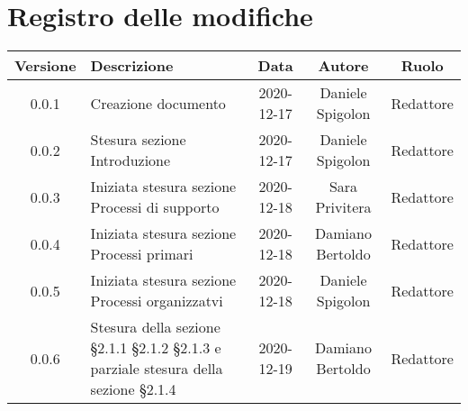 \section*{Registro delle modifiche}

\begin{center}
	\begin{longtable}{|c|p{5cm}|c|c|c|}
	\hline
	\rowcolor{lighter-grayer}
	\textbf{Versione} & \textbf{Descrizione} & \textbf{Data} & \textbf{Autore} & \textbf{Ruolo} \\
	\hline
	\endfirsthead


	0.0.1 & Creazione documento & 2020-12-17 & Daniele Spigolon & Redattore \\
	\hline
	0.0.2 & Stesura sezione Introduzione & 2020-12-17 & Daniele Spigolon & Redattore \\
	\hline
	0.0.3 & Iniziata stesura sezione Processi di supporto & 2020-12-18 & Sara Privitera & Redattore \\
	\hline	
	0.0.4 & Iniziata stesura sezione Processi primari & 2020-12-18 & Damiano Bertoldo & Redattore \\
	\hline
	0.0.5 & Iniziata stesura sezione Processi organizzatvi & 2020-12-18 & Daniele Spigolon & Redattore \\
	\hline
	0.0.6 & Stesura della sezione §2.1.1 §2.1.2 §2.1.3 e parziale stesura della sezione §2.1.4 & 2020-12-19 & Damiano Bertoldo & Redattore \\
	\hline
	

	\end{longtable}
\end{center}